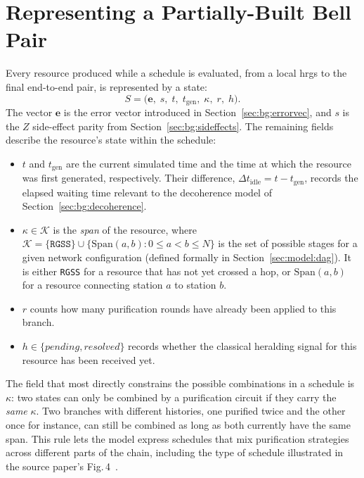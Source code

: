 \section{Representing a Partially-Built Bell Pair}
\label{sec:model:state}

Every resource produced while a schedule is evaluated, from a local \Gls{hrgs} to the final end-to-end pair, is represented by a state:
\[
    S = \bigl(\mathbf{e},\; s,\; t,\; t_{\mathrm{gen}},\; \kappa,\; r,\; h\bigr).
\]
The vector $\mathbf{e}$ is the error vector introduced in Section~\ref{sec:bg:errorvec}, and $s$ is the $Z$ side-effect parity from Section~\ref{sec:bg:sideffects}. The remaining fields describe the resource's state within the schedule:

\begin{itemize}
    \item $t$ and $t_{\mathrm{gen}}$ are the current simulated time and the time at which the resource was first generated, respectively. Their difference, $\Delta t_{\mathrm{idle}} = t - t_{\mathrm{gen}}$, records the elapsed waiting time relevant to the decoherence model of Section~\ref{sec:bg:decoherence}.
    \item $\kappa \in \mathcal{K}$ is the \emph{span} of the resource, where $\mathcal{K} = \{\mathtt{RGSS}\} \cup \{\mathrm{Span}(a,b) : 0 \le a < b \le N\}$ is the set of possible stages for a given network configuration (defined formally in Section~\ref{sec:model:dag}). It is either \texttt{RGSS} for a resource that has not yet crossed a hop, or $\mathrm{Span}(a,b)$ for a resource connecting station $a$ to station $b$.
    \item $r$ counts how many purification rounds have already been applied to this branch.
    \item $h \in \{\mathit{pending},\mathit{resolved}\}$ records whether the classical heralding signal for this resource has been received yet.
\end{itemize}

The field that most directly constrains the possible combinations in a schedule is $\kappa$: two states can only be combined by a purification circuit if they carry the \emph{same} $\kappa$. Two branches with different histories, one purified twice and the other once for instance, can still be combined as long as both currently have the same span. This rule lets the model express schedules that mix purification strategies across different parts of the chain, including the type of schedule illustrated in the source paper's Fig.\,4~\cite{Benchasattabuse2025Integrating}.


